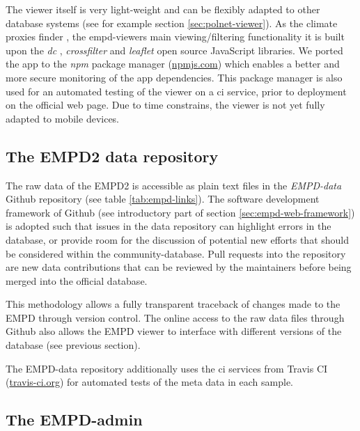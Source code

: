 \begin{refsection}
The viewer itself is very light-weight and can be flexibly adapted to other database systems (see for example section \ref{sec:polnet-viewer}). As the climate proxies finder \citep{BollietBrockmannMassonDelmotteEtAl2016, Brockmann2016}, the \gls{empd}-viewers main viewing/filtering functionality it is built upon the \textit{dc} \citep{ZhuDevelopers2019}, \textit{crossfilter} \citep{Squarecrossfiltercontributors2019} and \textit{leaflet} \citep{Agafonkin2019} open source JavaScript libraries. We ported the app to the \textit{npm} package manager (\href{https://www.npmjs.com/}{npmjs.com}) which enables a better and more secure monitoring of the app dependencies. This package manager is also used for an automated testing of the viewer on a \gls{ci} service, prior to deployment on the official web page. Due to time constrains, the viewer is not yet fully adapted to mobile devices. 

\subsection{The EMPD2 data repository}\label{sec:empd-data}

The raw data of the EMPD2 is accessible as plain text files in the \textit{EMPD-data} Github repository (see table \ref{tab:empd-links}). The software development framework of Github (see introductory part of section \ref{sec:empd-web-framework}) is adopted such that issues in the data repository can highlight errors in the database, or provide room for the discussion of potential new efforts that should be considered within the community-database. Pull requests into the repository are new data contributions that can be reviewed by the maintainers before being merged into the official database.

This methodology allows a fully transparent traceback of changes made to the EMPD through version control. The online access to the raw data files through Github also allows the EMPD viewer to interface with different versions of the database (see previous section). 

The EMPD-data repository additionally uses the \gls{ci} services from Travis CI (\href{https://travis-ci.org/}{travis-ci.org}) for automated tests of the meta data in each sample. 


\subsection{The EMPD-admin}\label{sec:empd-admin}


\end{refsection}

